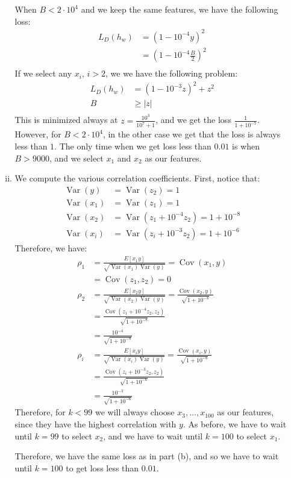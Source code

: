 \documentclass{amsart}
\DeclareMathOperator{\Var}{Var}  %
\DeclareMathOperator{\Cov}{Cov}
\theoremstyle{definition}
\begin{document}
\begin{enumerate}[(a)]
\begin{enumerate}[i.]
        When $B < 2 \cdot 10^{4}$ and we keep the same features, we have the following loss:
        \begin{align*}
          L_D(h_w) &= \left(1 - 10^{-4} y\right)^2\\
          &= \left(1 - 10^{-4} \frac{B}{2}\right)^2\\
        \end{align*}
        If we select any $x_i$, $i > 2$, we we have the following problem:
        \begin{align*}
          L_D(h_w) &= \left(1 - 10^{-3}z\right)^2 + z^2\\
          B &\ge |z|\\
        \end{align*}
        This is minimized always at $z = \frac{10^3}{10^7 + 1}$, and we get the loss $\frac{1}{1 + 10^{-7}}$. However, for $B < 2 \cdot 10^{4}$, in the other case we get that the loss is always less than $1$. 
        The only time when we get loss less than $0.01$ is when $B > 9000$, and we select $x_1$ and $x_2$ as our features. 
      \item
        We compute the various correlation coefficients. First, notice that:
        \begin{align*}
          \Var(y) &= \Var(z_2) = 1\\
          \Var(x_1) &= \Var(z_1) = 1\\
          \Var(x_2) &= \Var(z_1 + 10^{-4} z_2) = 1 + 10^{-8}\\
          \Var(x_i) &= \Var(z_i + 10^{-3} z_2) = 1 + 10^{-6}
        \end{align*}
        Therefore, we have:
        \begin{align*}
          \rho_1 &= \frac{E[x_1 y]}{\sqrt{\Var(x_1) \Var(y)}} = \Cov(x_1, y)\\
          &= \Cov(z_1, z_2) = 0\\
          \rho_2 &= \frac{E[x_2 y]}{\sqrt{\Var(x_2) \Var(y)}} = \frac{\Cov(x_2, y)}{\sqrt{1 + 10^{-8}}}\\
          &= \frac{\Cov(z_1 + 10^{-4} z_2, z_2)}{\sqrt{1 + 10^{-8}}}\\
          &= \frac{10^{-4}}{\sqrt{1 + 10^{-8}}}\\
          \rho_i &= \frac{E[x_i y]}{\sqrt{\Var(x_i) \Var(y)}} = \frac{\Cov(x_i, y)}{\sqrt{1 + 10^{-6}}}\\
          &= \frac{\Cov(z_i + 10^{-3} z_2, z_2)}{\sqrt{1 + 10^{-6}}}\\
          &= \frac{10^{-3}}{\sqrt{1 + 10^{-6}}}
        \end{align*}
        Therefore, for $k < 99$ we will always choose $x_3, \ldots, x_{100}$ as our features, since they have the highest correlation with $y$.
        As before, we have to wait until $k = 99$ to select $x_2$, and we have to wait until $k = 100$ to select $x_1$.

        Therefore, we have the same loss as in part (b), and so we have to wait until $k = 100$ to get loss less than $0.01$.
    \end{enumerate}
\end{enumerate}
\end{document}
